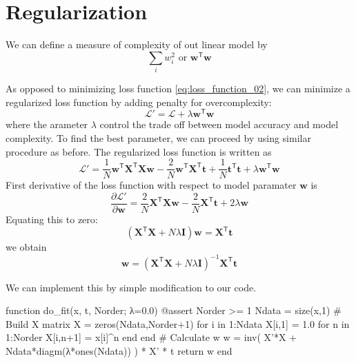 \documentclass[a4paper,11pt]{article} %
\begin{document}
\section{Regularization}

We can define a measure of complexity of out linear model by
\begin{equation}
\sum_{i} w_{i}^{2}\,\,\text{or }\mathbf{w}^{\mathsf{T}}\mathbf{w}
\end{equation}

As opposed to minimizing loss function \eqref{eq:loss_function_02}, we can minimize
a regularized loss function by adding penalty for overcomplexity:
\begin{equation*}
\mathcal{L}' = \mathcal{L} + \lambda \mathbf{w}^{\mathsf{T}} \mathbf{w}
\end{equation*}
where the arameter $\lambda$ control the trade off between model accuracy and
model complexity.
To find the best parameter, we can proceed by using similar procedure as before.
The regularized loss function is written as
\begin{equation}
\mathcal{L}' = \frac{1}{N} \mathbf{w}^{\mathsf{T}} \mathbf{X}^{\mathsf{T}} \mathbf{X} \mathbf{w}
- \frac{2}{N} \mathbf{w}^{\mathsf{T}} \mathbf{X}^{\mathsf{T}} \mathbf{t}
+ \frac{1}{N} \mathbf{t}^{\mathsf{T}} \mathbf{t}
+ \lambda \mathbf{w}^{\mathsf{T}} \mathbf{w}
\end{equation}
First derivative of the loss function with respect to model paramater $\mathbf{w}$ is
\begin{equation*}
\frac{\partial \mathcal{L}'}{\partial \mathbf{w}} =
\frac{2}{N} \mathbf{X}^{\mathsf{T}} \mathbf{X} \mathbf{w}
- \frac{2}{N} \mathbf{X}^{\mathsf{T}} \mathbf{t} + 2\lambda\mathbf{w}
\end{equation*}
Equating this to zero:
\begin{equation*}
( \mathbf{X}^{\mathsf{T}} \mathbf{X} + N \lambda \mathbf{I} ) \mathbf{w} = \mathbf{X}^{\mathsf{T}} \mathbf{t}
\end{equation*}
we obtain
\begin{equation}
\mathbf{w} =
( \mathbf{X}^{\mathsf{T}} \mathbf{X} + N \lambda \mathbf{I} )^{-1}
\mathbf{X}^{\mathsf{T}} \mathbf{t}
\end{equation}

We can implement this by simple modification to our code.
\begin{juliacode}
function do_fit(x, t, Norder; λ=0.0)
  @assert Norder >= 1
  Ndata = size(x,1)
  # Build X matrix
  X = zeros(Ndata,Norder+1)
  for i in 1:Ndata
    X[i,1] = 1.0
    for n in 1:Norder
      X[i,n+1] = x[i]^n
    end
  end
  # Calculate w
  w = inv( X'*X + Ndata*diagm(λ*ones(Ndata)) ) * X' * t
  return w
end
\end{juliacode}
\end{document}
